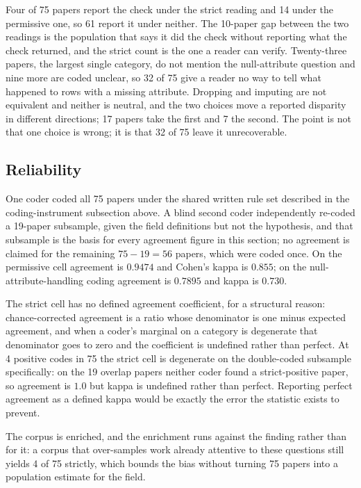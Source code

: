 Four of 75 papers report the check under the strict reading and 14 under the
permissive one, so 61 report it under neither. The 10-paper gap between the two
readings is the population that says it did the check without reporting what the
check returned, and the strict count is the one a reader can verify. Twenty-three
papers, the largest single category, do not mention the null-attribute question
and nine more are coded unclear, so 32 of 75 give a reader no way to tell what
happened to rows with a missing attribute. Dropping and imputing are not
equivalent and neither is neutral, and the two choices move a reported disparity
in different directions; 17 papers take the first and 7 the second. The point is
not that one choice is wrong; it is that 32 of 75 leave it unrecoverable.

\subsection{Reliability}
\label{sup:sec:survey-reliability}

One coder coded all 75 papers under the shared written rule set described in
the coding-instrument subsection above. A blind second coder independently re-coded a
19-paper subsample, given the field definitions but not the hypothesis, and
that subsample is the basis for every agreement figure in this section; no
agreement is claimed for the remaining $75 - 19 = 56$ papers, which were coded
once. On the permissive cell agreement is $0.9474$ and Cohen's kappa is
$0.855$; on the
null-attribute-handling coding agreement is $0.7895$ and kappa is $0.730$.

The strict cell has no defined agreement coefficient, for a structural
reason: chance-corrected agreement
\citep{cohen1960kappa} is a ratio whose denominator is one minus expected
agreement, and when a coder's marginal on a category is degenerate that
denominator goes to zero and the coefficient is undefined rather than perfect. At
4 positive codes in 75 the strict cell is degenerate on the double-coded
subsample specifically: on the 19 overlap papers neither coder found a
strict-positive paper, so agreement is $1.0$ but kappa is undefined rather
than perfect. Reporting perfect agreement as a defined kappa would be exactly
the error the statistic exists to prevent.

The corpus is enriched, and the enrichment runs against the finding rather
than for it: a corpus that over-samples work already attentive to these
questions still yields 4 of 75 strictly, which bounds the bias without
turning 75 papers into a population estimate for the field.


